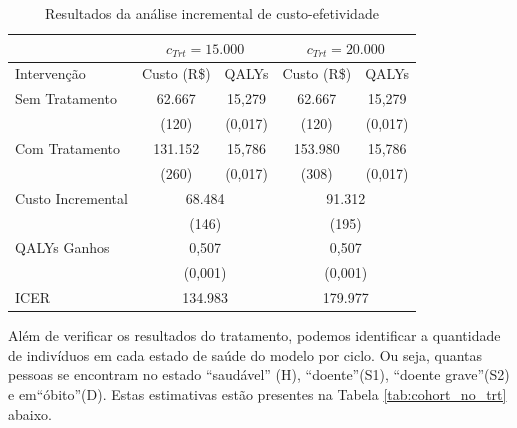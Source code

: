 \documentclass[12pt, a4paper, openany]{book}
\numberwithin{equation}{chapter}
\numberwithin{table}{chapter}
\numberwithin{figure}{chapter}
\theoremstyle{break}
\begin{document}
\begin{table}[H] 
\centering 
\renewcommand{\arraystretch}{1.5}
\caption{Resultados da análise incremental de custo-efetividade}
\label{tab:icer_results_2}
\begin{tabular}{lcccc} 
\hline 
\hline 
& \multicolumn{2}{c}{$c_{Trt} = 15.000$} & \multicolumn{2}{c}{$c_{Trt} = 20.000$} \\
\hline
Intervenção & \multicolumn{1}{c}{Custo (R\$)} & QALYs & \multicolumn{1}{c}{Custo (R\$)} & QALYs  \\ 
\hline 
Sem Tratamento & 62.667 & 15,279 & 62.667 & 15,279 \\ 
               & (120)   & (0,017) & (120)   & (0,017) \\ 
Com Tratamento & 131.152 & 15,786 & 153.980 & 15,786 \\ 
               & (260)   & (0,017) & (308)   & (0,017) \\ 
\hline 
Custo Incremental & \multicolumn{2}{c}{68.484} & \multicolumn{2}{c}{91.312} \\ 
                  & \multicolumn{2}{c}{(146)} & \multicolumn{2}{c}{(195)} \\ 
QALYs Ganhos      & \multicolumn{2}{c}{0,507} & \multicolumn{2}{c}{0,507} \\ 
                  & \multicolumn{2}{c}{(0,001)} & \multicolumn{2}{c}{(0,001)} \\ 
ICER              & \multicolumn{2}{c}{134.983} & \multicolumn{2}{c}{179.977} \\ 
\hline 
\hline 
\end{tabular} 
\end{table}

Além de verificar os resultados do tratamento, podemos identificar a quantidade de indivíduos em cada estado de saúde do modelo por ciclo. Ou seja, quantas pessoas se encontram no estado ``saudável'' (H), ``doente''(S1), ``doente grave''(S2) e em``óbito''(D). Estas estimativas estão presentes na Tabela \ref{tab:cohort_no_trt} abaixo.
\end{document}
